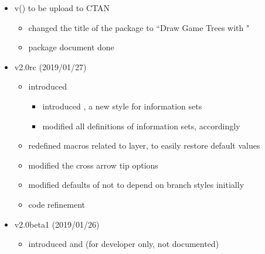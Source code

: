 \begin{itemize}
\item v\tmpversion (\tmpdate) to be upload to CTAN
  \begin{itemize}
  \item changed the title of the package to ``Draw Game Trees with \Tikz"
  \item package document done
  \end{itemize}
\item v2.0rc (2019/01/27)
  \begin{itemize}
  \item introduced \cmd{\setxtinfosetstyle}
    \begin{itemize}
    \item introduced , a new style for information sets
    \item modified all definitions of information sets, accordingly
    \end{itemize}
  \item redefined macros related to layer, to easily restore default values
  \item modified the cross arrow tip options
  \item modified defaults of \cmd{\setxtarrowtips} not to depend on branch styles initially
  \item code refinement
  \end{itemize}
\item v2.0beta1 (2019/01/26)
  \begin{itemize}
  \item introduced \cmd{\xtshowXpoints} and \cmd{\xtshowXcircles} (for developer only, not documented)
  \end{itemize}

\end{itemize}
